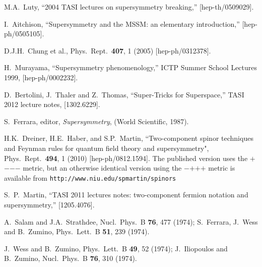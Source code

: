 \documentclass[11pt]{article}
\begin{document}
\begin{thebibliography}{999}
M.A.~Luty,
  ``2004 TASI lectures on supersymmetry breaking,''
  [hep-th/0509029].

I.~Aitchison,%
  ``Supersymmetry and the MSSM: an elementary introduction,''
  [hep-ph/0505105].

D.J.H.~Chung et al., 
  Phys.\ Rept.\  {\bf 407}, 1 (2005)
  [hep-ph/0312378].

  H.~Murayama,
  ``Supersymmetry phenomenology,'' ICTP Summer School Lectures 1999,
  [hep-ph/0002232].

  D.~Bertolini, J.~Thaler and Z.~Thomas,
  ``Super-Tricks for Superspace,''
  TASI 2012 lecture notes, 
  [1302.6229].
  
S.~Ferrara, editor, {\em Supersymmetry},
(World Scientific, 1987).

 H.K.~Dreiner, H.E.~Haber, and S.P.~Martin,
  ``Two-component spinor techniques and Feynman rules for
  quantum field theory and supersymmetry",
  Phys.\ Rept.\  {\bf 494}, 1 (2010)
  [hep-ph/0812.1594]. The published version uses the $+$$-$$-$$-$ metric,
  but an otherwise identical version using the $-$$+$$+$$+$ metric is available from
  \verb$http://www.niu.edu/spmartin/spinors$ 

  S.~P.~Martin,
  ``TASI 2011 lectures notes: two-component fermion notation and supersymmetry,''
  [1205.4076].

A.~Salam and J.A.~Strathdee,
  Nucl.\ Phys.\ B {\bf 76}, 477 (1974);
S.~Ferrara, J.~Wess and B.~Zumino,
  Phys.\ Lett.\ B {\bf 51}, 239 (1974).

J.~Wess and B.~Zumino,
  Phys.\ Lett.\ B {\bf 49}, 52 (1974);
J.~Iliopoulos and B.~Zumino,
  Nucl.\ Phys.\ B {\bf 76}, 310 (1974).


\end{thebibliography}
\end{document}

